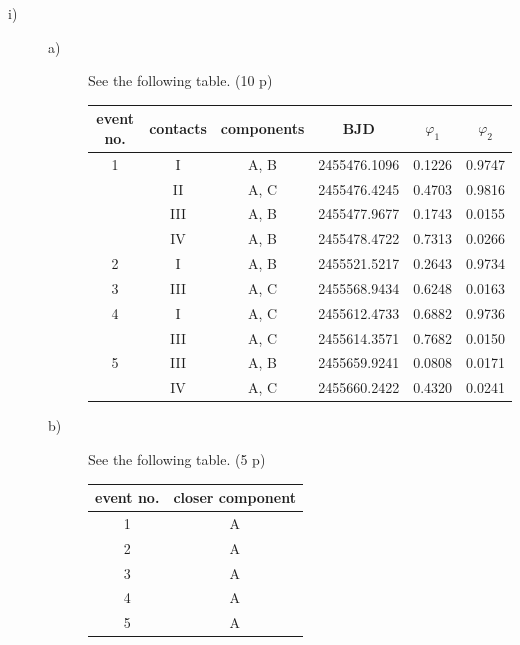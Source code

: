
\begin{description}
\item[i)] \hfill
  \begin{description}
  \item[a)] See the following table. \hfill(10 p)

    \begin{center}
    \begin{tabular}{cccccc}
      \hline
      event no. & contacts & components & BJD & $\varphi_1$ & $\varphi_2$ \\
      \hline
      1 & I   & A, B & 2455476.1096 & 0.1226 & 0.9747 \\
        & II  & A, C & 2455476.4245 & 0.4703 & 0.9816 \\
        & III & A, B & 2455477.9677 & 0.1743 & 0.0155 \\
        & IV  & A, B & 2455478.4722 & 0.7313 & 0.0266 \\
      2 & I   & A, B & 2455521.5217 & 0.2643 & 0.9734 \\
      3 & III & A, C & 2455568.9434 & 0.6248 & 0.0163 \\
      4 & I   & A, C & 2455612.4733 & 0.6882 & 0.9736 \\
        & III & A, C & 2455614.3571 & 0.7682 & 0.0150 \\
      5 & III & A, B & 2455659.9241 & 0.0808 & 0.0171 \\
        & IV  & A, C & 2455660.2422 & 0.4320 & 0.0241 \\
      \hline
    \end{tabular}
    \end{center}

  \item[b)] See the following table. \hfill(5 p)

    \begin{center}
    \begin{tabular}{cc}
      \hline
      event no. & closer component \\
      \hline
      1 & A \\
      2 & A \\
      3 & A \\
      4 & A \\
      5 & A \\
      \hline
    \end{tabular}
    \end{center}


\end{description}
\end{description}
